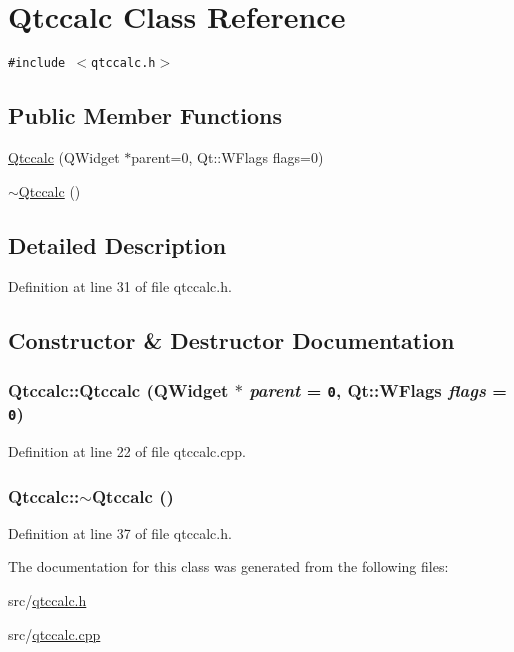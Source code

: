 \hypertarget{classQtccalc}{
\section{Qtccalc Class Reference}
\label{classQtccalc}
}
{\tt \#include $<$qtccalc.h$>$}

\subsection*{Public Member Functions}
\begin{CompactItemize}
\item 
\hyperlink{classQtccalc_7b0da403f0b79e224f2b9d7bbdc063fc}{Qtccalc} (QWidget $\ast$parent=0, Qt::WFlags flags=0)
\item 
\hyperlink{classQtccalc_53144f0a9571ddd1c797e15fe07ff57f}{$\sim$Qtccalc} ()
\end{CompactItemize}


\subsection{Detailed Description}


Definition at line 31 of file qtccalc.h.

\subsection{Constructor \& Destructor Documentation}
\hypertarget{classQtccalc_7b0da403f0b79e224f2b9d7bbdc063fc}{
\subsubsection[{Qtccalc}]{\setlength{\rightskip}{0pt plus 5cm}Qtccalc::Qtccalc (QWidget $\ast$ {\em parent} = {\tt 0}, \/  Qt::WFlags {\em flags} = {\tt 0})}}
\label{classQtccalc_7b0da403f0b79e224f2b9d7bbdc063fc}




Definition at line 22 of file qtccalc.cpp.\hypertarget{classQtccalc_53144f0a9571ddd1c797e15fe07ff57f}{
\subsubsection[{$\sim$Qtccalc}]{\setlength{\rightskip}{0pt plus 5cm}Qtccalc::$\sim$Qtccalc ()}}
\label{classQtccalc_53144f0a9571ddd1c797e15fe07ff57f}




Definition at line 37 of file qtccalc.h.

The documentation for this class was generated from the following files:\begin{CompactItemize}
\item 
src/\hyperlink{qtccalc_8h}{qtccalc.h}\item 
src/\hyperlink{qtccalc_8cpp}{qtccalc.cpp}\end{CompactItemize}
